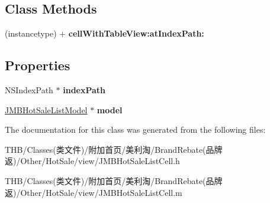 \subsection*{Class Methods}
\begin{DoxyCompactItemize}
\item 
\mbox{\label{interface_j_m_b_hot_sale_list_cell_aacb25eff6143c5f818bb68585710932b}} 
(instancetype) + {\bfseries cell\+With\+Table\+View\+:at\+Index\+Path\+:}
\end{DoxyCompactItemize}
\subsection*{Properties}
\begin{DoxyCompactItemize}
\item 
\mbox{\label{interface_j_m_b_hot_sale_list_cell_a6b5f9c26fe5c579318da978736ddad6b}} 
N\+S\+Index\+Path $\ast$ {\bfseries index\+Path}
\item 
\mbox{\label{interface_j_m_b_hot_sale_list_cell_ac33a761a66d48d3b228319b7da5963a1}} 
\mbox{\hyperlink{interface_j_m_b_hot_sale_list_model}{J\+M\+B\+Hot\+Sale\+List\+Model}} $\ast$ {\bfseries model}
\end{DoxyCompactItemize}


The documentation for this class was generated from the following files\+:\begin{DoxyCompactItemize}
\item 
T\+H\+B/\+Classes(类文件)/附加首页/美利淘/\+Brand\+Rebate(品牌返)/\+Other/\+Hot\+Sale/view/J\+M\+B\+Hot\+Sale\+List\+Cell.\+h\item 
T\+H\+B/\+Classes(类文件)/附加首页/美利淘/\+Brand\+Rebate(品牌返)/\+Other/\+Hot\+Sale/view/J\+M\+B\+Hot\+Sale\+List\+Cell.\+m\end{DoxyCompactItemize}
